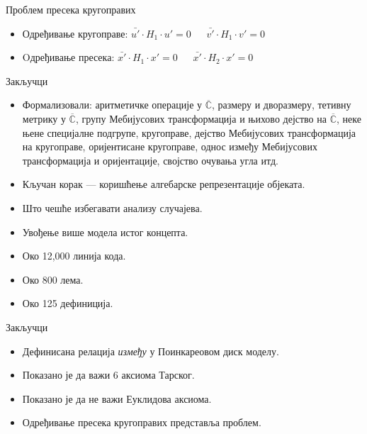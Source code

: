 \documentclass[slidestop, compress, mathserif, containsverbatim, xcolor=dvipsnames]{beamer}
\renewcommand{\C}[0]{\ensuremath{\mathbb{C}}}
\newcommand{\extC}[0]{\ensuremath{\overline{\C}}}
\begin{document}
\begin{frame}{Проблем пресека кругоправих}
  \begin{itemize}
  \item Одређивање кругоправе: $\bar{u'}\cdot H_1\cdot u' = 0\ \ \ \ \ \ \ \bar{v'}\cdot H_1\cdot v' = 0$
  \item Oдређивање пресека: $\bar{x'}\cdot H_1\cdot x' = 0\ \ \ \ \ \ \ \bar{x'}\cdot H_2\cdot x' = 0$

   \begin{center}
     
   \end{center}
  \end{itemize}
\end{frame}

\begin{frame}{Закључци}
  \begin{itemize}
   \item Формализовали: аритметичке операције у $\extC$, размеру и
     дворазмеру, тетивну метрику у $\extC$, групу Мебијусових
     трансформација и њихово дејство на $\extC$, неке њене специјалне
     подгрупе, кругоправе, дејство Мебијусових трансформација на
     кругоправе, оријентисане кругоправе, однос између Мебијусових
     трансформација и оријентације, својство очувања угла итд.
   \item Кључан корак --- коришћење алгебарске репрезентације објеката.
   \item Што чешће избегавати анализу случајева.
   \item Увођење више модела истог концепта.
   \item Око 12,000 линија кода.
   \item Око 800 лема.
   \item Око 125 дефиниција.
  \end{itemize}
\end{frame}

\begin{frame}{Закључци}
  \begin{itemize}
   \item Дефинисана релација \emph{између} у Поинкареовом диск моделу.
   \item Показано је да важи $6$ аксиома Тарског.
   \item Показано је да не важи Еуклидова аксиома.
   \item Одређивање пресека кругоправих представља проблем.
  \end{itemize}
\end{frame}
\end{document}
